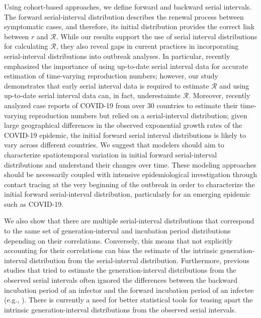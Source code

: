 \documentclass[12pt]{article}
\newcommand{\RR}{\ensuremath{{\mathcal R}}\xspace}
\begin{document}
Using cohort-based approaches, we define forward and backward serial intervals.
The forward serial-interval distribution describes the renewal process between symptomatic cases, and therefore, its initial distribution provides the correct link between $r$ and \RR.
While our results support the use of serial interval distributions for calculating \RR, 
they also reveal gaps in current practices in incorporating serial-interval distributions into outbreak analyses.
In particular, \cite{thompson2019improved} recently emphasized the importance of using up-to-date serial interval data for accurate estimation of time-varying reproduction numbers;
however, our study demonstrates that early serial interval data is required to estimate \RR and using up-to-date serial interval data can, in fact, underestaimte \RR.
Moreover, \cite{tempvar} recently analyzed case reports of COVID-19 from over 30 countries to estimate their time-varying reproduction numbers but relied on a serial-interval distribution;
given large geographical differences in the observed exponential growth rates of the COVID-19 epidemic, the initial forward serial interval distributions is likely to vary across different countries.
We suggest that modelers should aim to characterize spatiotemporal variation in initial forward serial-interval distributions and understand their changes over time.
These modeling approaches should be necessarily coupled with intensive epidemiological investigation through contact tracing at the very beginning of the outbreak in order to characterize the initial forward serial-interval distribution, particularly for an emerging epidemic such as COVID-19.

We also show that there are multiple serial-interval distributions that correspond to the same set of generation-interval and incubation period distributions depending on their correlations.
Conversely, this means that not explicitly accounting for their correlations can bias the estimate of the intrinsic generation-interval distribution from the serial-interval distribution.
Furthermore, previous studies that tried to estimate the generation-interval distributions from the observed serial intervals often ignored the differences between the backward incubation period of an infector and the forward incubation period of an infectee (e.g., \cite{klinkenberg2011correlation, ganyani2020estimating}).
There is currently a need for better statistical tools for teasing apart the intrinsic generation-interval distributions from the observed serial intervals.
\end{document}
